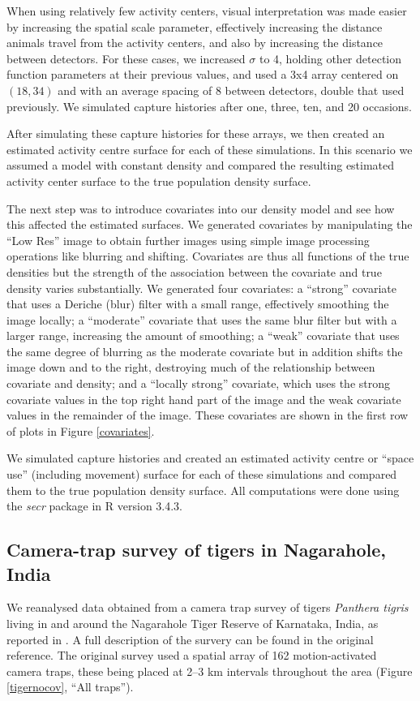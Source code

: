 \documentclass[a4paper,12pt]{article}
\begin{document}
When using relatively few activity centers, visual interpretation was made easier by increasing the spatial scale parameter, effectively increasing the distance animals travel from the activity centers, and also by increasing the distance between detectors. For these cases, we increased $\sigma$ to 4, holding other detection function parameters at their previous values, and used a 3x4 array centered on $(18,34)$ and with an average spacing of 8 between detectors, double that used previously. We simulated capture histories after one, three, ten, and 20 occasions. 

After simulating these capture histories for these arrays, we then created an estimated activity centre surface for each of these simulations. In this scenario we assumed a model with constant density and compared the resulting estimated activity center surface to the true population density surface.

The next step was to introduce covariates into our density model and see how this affected the estimated surfaces. We generated covariates by manipulating the ``Low Res'' image to obtain further images using simple image processing operations like blurring and shifting. Covariates are thus all functions of the true densities but the strength of the association between the covariate and true density varies substantially. We generated four covariates: a ``strong'' covariate that uses a Deriche (blur) filter with a small range, effectively smoothing the image locally; a ``moderate'' covariate that uses the same blur filter but with a larger range, increasing the amount of smoothing; a ``weak'' covariate that uses the same degree of blurring as the moderate covariate but in addition shifts the image down and to the right, destroying much of the relationship between covariate and density; and a ``locally strong'' covariate, which uses the strong covariate values in the top right hand part of the image and the weak covariate values in the remainder of the image. These covariates are shown in the first row of plots in Figure \ref{covariates}.

We simulated capture histories and created an estimated activity centre or ``space use'' (including movement) surface for each of these simulations and compared them to the true population density surface. All computations were done using the {\it secr} package in R version 3.4.3. 

\subsection{Camera-trap survey of tigers in Nagarahole, India}
We reanalysed data obtained from a camera trap survey of tigers {\it Panthera tigris} living in and around the Nagarahole Tiger Reserve of Karnataka, India, as reported in \cite{Dorazio2017}. A full description of the survery can be found in the original reference. The original survey used a spatial array of 162 motion-activated camera traps, these being placed at 2–3 km intervals throughout the area (Figure \ref{tigernocov}, ``All traps''). 
\end{document}
